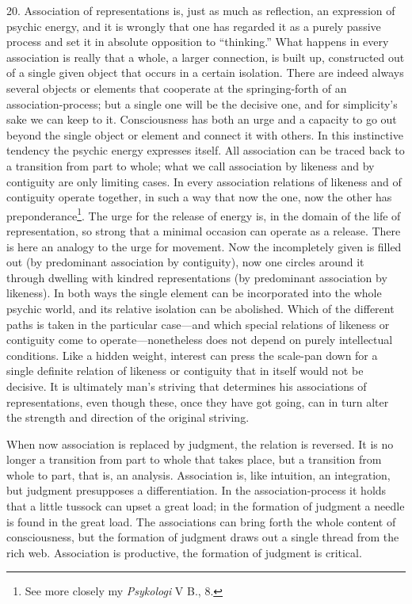 \documentclass[12pt,a4paper]{book}
\newcommand{\opage}[1]{\marginnote{\footnotesize\textit{[#1]}}}
\begin{document}
20. Association of representations is, just as much as reflection, an
expression of psychic energy, and it is wrongly that one has regarded it as
a purely passive process and set it in absolute opposition to ``thinking.''
What happens in every association is really that a whole, a larger
connection, is built up, constructed out of a single given object that
occurs in a certain isolation. There are indeed always several objects or
elements that cooperate at the springing-forth of an association-process;
but a single one will be the decisive one, and for simplicity's sake we can
keep to it. Consciousness has both an urge and a capacity to go out beyond
the single object or element and connect it with others. In this instinctive
tendency the psychic energy expresses itself. All association can be traced
back to a transition from part to whole; what we call association by
likeness and by contiguity are only limiting cases. In every association
relations of likeness and of contiguity operate together, in such a way
that now the one, now the other has preponderance\footnote{See more
closely my \emph{Psykologi} V B., 8.}. The urge for the release of energy
is, in the domain of the life of representation, so strong that a minimal
occasion can operate as a release. There is here an analogy to the urge for
movement. Now the incompletely given is filled out (by predominant
association by contiguity), now one circles around it through dwelling with
kindred representations (by predominant association by likeness). In both
ways the single element can be incorporated into the whole psychic \opage{62}world,
and its relative isolation can be abolished. Which of the different paths is
taken in the particular case---and which special relations of likeness or
contiguity come to operate---nonetheless does not depend on purely
intellectual conditions. Like a hidden weight, interest can press the
scale-pan down for a single definite relation of likeness or contiguity
that in itself would not be decisive. It is ultimately man's striving that
determines his associations of representations, even though these, once
they have got going, can in turn alter the strength and direction of the
original striving.

When now association is replaced by judgment, the relation is reversed. It
is no longer a transition from part to whole that takes place, but a
transition from whole to part, that is, an analysis. Association is, like
intuition, an integration, but judgment presupposes a differentiation. In
the association-process it holds that a little tussock can upset a great
load; in the formation of judgment a needle is found in the great load. The
associations can bring forth the whole content of consciousness, but the
formation of judgment draws out a single thread from the rich web.
Association is productive, the formation of judgment is critical.
\end{document}
